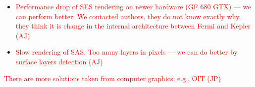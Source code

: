 \begin{itemize}
  \item \textcolor{red}{Performance drop of SES rendering on newer hardware (GF 680 GTX) --- we can perform better. We contacted authors, they do not know exactly why, they think it is change in the internal architecture between Fermi and Kepler (AJ)}
  \item \textcolor{red}{Slow rendering of SAS. Too many layers in pixels --- we can do better by surface layers detection (AJ)}
\end{itemize}

\textcolor{red}{There are more solutions taken from computer graphics; e.g., OIT (JP)}



